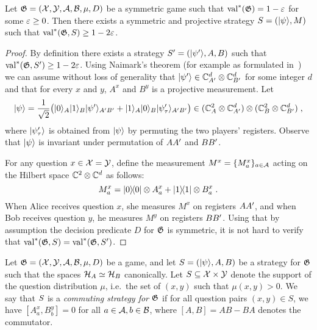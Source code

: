 \begin{lemma}\label{lem:symmetric-strat}
  Let $\game = (\cal{X}, \cal{Y}, \cal{A}, \cal{B}, \mu, D)$ be a symmetric game
  such that $\val^*(\game) = 1-\eps$ for some $\eps\geq 0$.
  Then there exists a symmetric and projective strategy
  $\strategy=(\ket{\psi},M)$ such that $\val^*(\game,\strategy)\geq 1-2\eps$.
\end{lemma}

\begin{proof}
  By definition there exists a strategy $\strategy'= (\ket{\psi'},A,B)$ such
  that $\val^*(\game,\strategy')\geq 1-2\eps$.
Using Naimark's theorem (for example as formulated in~\cite[Theorem 4.2]{NW19}) we can assume
without loss of generality that $\ket{\psi'}\in\C_{\alice'}^d\otimes \C_{\bob'}^d$ for some integer $d$
  and that for every $x$ and $y$, $A^x$ and $B^y$ is a projective measurement.
  Let
  \[
    \ket{\psi} = \frac{1}{\sqrt{2}} \big( \ket{0}_\alice \ket{1}_\bob
    \ket{\psi'}_{\alice'\bob'} + \ket{1}_\alice \ket{0}_\bob
    \ket{\psi'_\tau}_{\alice'\bob'}\big) \in (\C_{\alice}^2 \otimes
    \C_{\alice'}^d) \otimes (\C_\bob^2 \otimes \C_{\bob'}^d)\;,
  \]
  where $\ket{\psi'_\tau}$ is obtained from $\ket{\psi}$ by permuting the two
  players' registers.
  Observe that $\ket{\psi}$ is invariant under permutation of $\alice\alice'$
  and $\bob\bob'$.
  
  For any question $x\in \cal{X}=\cal{Y}$, define the measurement $M^x = \{M^x_a\}_{a \in \cal{A}}$
  acting on the Hilbert space $\C^2 \otimes \C^d$ as follows:
  \[
  	M^x_a = \ketbra{0}{0} \otimes A^x_a + \ketbra{1}{1} \otimes B^x_a \;.
  \]
  When Alice receives question $x$, she measures $M^x$ on registers $\alice \alice'$, and when Bob receives 
  question $y$, he measures $M^y$ on registers $\bob \bob'$.
  Using that by assumption the decision predicate $D$ for $\game$ is symmetric,
  it is not hard to verify that $\val^*(\game,\strategy) =
  \val^*(\game,\strategy')$.
\end{proof}

\begin{definition}
  \label{def:comm-strategy}
  Let $\game = (\cal{X}, \cal{Y}, \cal{A}, \cal{B}, \mu, D)$ be a game, and let
  $\strategy = (\ket{\psi}, A, B)$ be a strategy for $\game$ such that the
  spaces $\mH_A \simeq \mH_B$ canonically.
  Let $S \subseteq \cal{X} \times \cal{Y}$ denote the support of the question
  distribution $\mu$, i.e.\ the set of $(x,y)$ such that $\mu(x,y)>0$.
  We say that $\strategy$ is a \emph{commuting strategy for $\game$} if for all
  question pairs $(x, y) \in S$, we have $[A^x_a, B^y_b] = 0$ 
  for all $a
  \in \cal{A}, b \in \cal{B}$, where $[A, B] = AB - BA$ denotes the commutator.
\end{definition}

